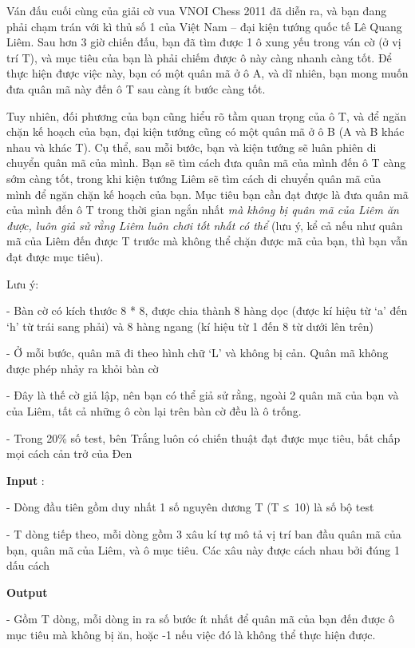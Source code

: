 



   Ván đấu cuối cùng của giải cờ vua VNOI Chess 2011 đã diễn ra, và bạn đang phải chạm trán với kì thủ số 1 của Việt Nam – đại kiện tướng quốc tế Lê Quang Liêm. Sau hơn 3 giờ chiến đấu, bạn đã tìm được 1 ô xung yếu trong ván cờ (ở vị trí T), và mục tiêu của bạn là phải chiếm được ô này càng nhanh càng tốt. Để thực hiện được việc này, bạn có một quân mã ở ô A, và dĩ nhiên, bạn mong muốn đưa quân mã này đến ô T sau càng ít bước càng tốt.  

   Tuy nhiên, đối phương của bạn cũng hiểu rõ tầm quan trọng của ô T, và để ngăn chặn kế hoạch của bạn, đại kiện tướng cũng có một quân mã ở ô B (A và B khác nhau và khác T). Cụ thể, sau mỗi bước, bạn và kiện tướng sẽ luân phiên di chuyển quân mã của mình. Bạn sẽ tìm cách đưa quân mã của mình đến ô T càng sớm càng tốt, trong khi kiện tướng Liêm sẽ tìm cách di chuyển quân mã của mình để ngăn chặn kế hoạch của bạn. Mục tiêu bạn cần đạt được là đưa quân mã của mình đến ô T trong thời gian ngắn nhất   \emph{    mà không bị quân mã của Liêm ăn được, luôn giả sử rằng Liêm luôn chơi tốt nhất có thể   }   (lưu ý, kể cả nếu như quân mã của Liêm đến được T trước mà không thể chặn được mã của bạn, thì bạn vẫn đạt được mục tiêu).  

   Lưu ý:  

   - Bàn cờ có kích thước 8 * 8, được chia thành 8 hàng dọc (được kí hiệu từ ‘a’ đến ‘h’ từ trái sang phải) và 8 hàng ngang (kí hiệu từ 1 đến 8 từ dưới lên trên)  

   - Ở mỗi bước, quân mã đi theo hình chữ ‘L’ và không bị cản. Quân mã không được phép nhảy ra khỏi bàn cờ  

   - Đây là thế cờ giả lập, nên bạn có thể giả sử rằng, ngoài 2 quân mã của bạn và của Liêm, tất cả những ô còn lại trên bàn cờ đều là ô trống.  

   - Trong 20\% số test, bên Trắng luôn có chiến thuật đạt được mục tiêu, bất chấp mọi cách cản trở của Đen  

\textbf{    Input   }   :  

   - Dòng đầu tiên gồm duy nhất 1 số nguyên dương T (T ≤ 10) là số bộ test  

   - T dòng tiếp theo, mỗi dòng gồm 3 xâu kí tự mô tả vị trí ban đầu quân mã của bạn, quân mã của Liêm, và ô mục tiêu. Các xâu này được cách nhau bởi đúng 1 dấu cách  

\textbf{    Output   }

   - Gồm T dòng, mỗi dòng in ra số bước ít nhất để quân mã của bạn đến được ô mục tiêu mà không bị ăn, hoặc -1 nếu việc đó là không thể thực hiện được.  

